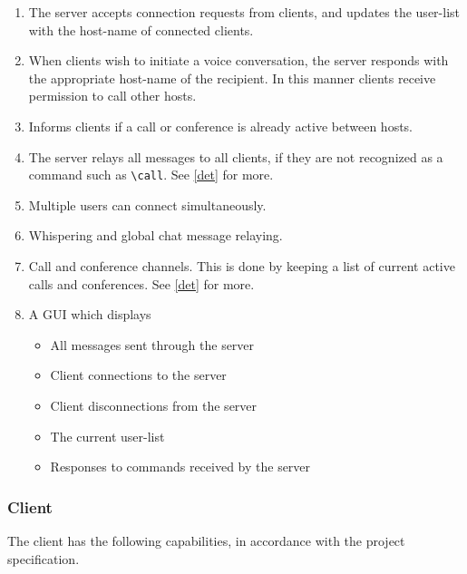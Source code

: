 \documentclass[10pt,a4paper]{article}
\begin{document}
\begin{enumerate}
 \item The server accepts connection requests from clients, and updates the user-list with the host-name of connected clients.
 \item When clients wish to initiate a voice conversation, the server responds with the appropriate host-name of the recipient. 
In this manner clients receive permission to call other hosts.
 \item Informs clients if a call or conference is already active between hosts.
 \item The server relays all messages to all clients, if they are not recognized as a command such as \verb|\call|. See \ref{det} for more.
 \item Multiple users can connect simultaneously.
 \item Whispering and global chat message relaying.
 \item Call and conference channels. This is done by keeping a list of current active calls and conferences. See \ref{det} for more.
 \item A GUI which displays 
 \begin{itemize}
  \item All messages sent through the server
  \item Client connections to the server
  \item Client disconnections from the server
  \item The current user-list
  \item Responses to commands received by the server
 \end{itemize}

\end{enumerate}

\subsubsection{Client}
The client has the following capabilities, in accordance with the project specification.
\end{document}
